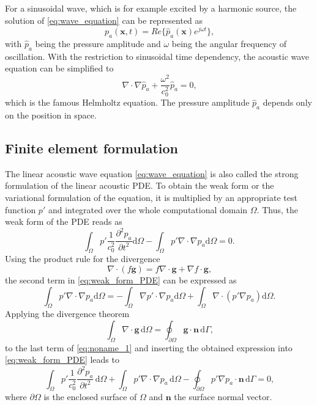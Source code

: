 For a sinusoidal wave, which is for example excited by a harmonic source, the solution of \cref{eq:wave_equation} can be represented as
\begin{equation}
	p_a(\boldsymbol{x},t) = Re\lbrace\hat{p}_a(\boldsymbol{x})e^{j\omega t}\rbrace \text{,} \label{eq:sinusoidal_wave}
\end{equation}
with $\hat{p}_a$ being the pressure amplitude and $\omega$ being the angular frequency of oscillation. With the restriction to sinusoidal time dependency, the acoustic wave equation can be simplified to
\begin{equation}
	\nabla\cdot\nabla\hat{p}_a + \frac{\omega^2}{c_0^2}\hat{p}_a = 0 \text{,} \label{eq:helmholtz_equation}
\end{equation}
which is the famous Helmholtz equation. The pressure amplitude $\hat{p}_a$ depends only on the position in space.

\subsection*{Finite element formulation}

The linear acoustic wave equation \cref{eq:wave_equation} is also called the strong formulation of the linear acoustic PDE. To obtain the weak form or the variational formulation of the equation, it is multiplied by an appropriate test function $p'$ and integrated over the whole computational domain $\Omega$. Thus, the weak form of the PDE reads as
\begin{equation}
	\int_{\Omega}p'\frac{1}{c_0^2}\frac{\partial^2 p_a}{\partial t^2}\text{d}\Omega - \int_{\Omega}p'\nabla\cdot\nabla p_a\text{d}\Omega = 0\text{.} \label{eq:weak_form_PDE}
\end{equation}
Using the product rule for the divergence
\begin{equation}
	\nabla\cdot(f\boldsymbol{g}) = f\nabla\cdot\boldsymbol{g} + \nabla f \cdot \boldsymbol{g}\text{,}
\end{equation}
the second term in \cref{eq:weak_form_PDE} can be expressed as
\begin{equation}
	\int_{\Omega}p'\nabla\cdot\nabla p_a\text{d}\Omega = - \int_{\Omega}\nabla p'\cdot\nabla p_a\text{d}\Omega + \int_{\Omega}\nabla\cdot(p'\nabla p_a)\text{d}\Omega \text{.} \label{eq:noname_1}
\end{equation}
Applying the divergence theorem \cite{kreyszig_advanced, wiley_mathematics_1995}
\begin{equation}
	\int_{\Omega} \nabla\cdot \boldsymbol{g}\,\text{d}\Omega = \oint_{\partial \Omega} \boldsymbol{g}\cdot\boldsymbol{n}\,\text{d}\Gamma \text{,}
\end{equation}
to the last term of \cref{eq:noname_1} and inserting the obtained expression into \cref{eq:weak_form_PDE} leads to
\begin{equation}
	\int_{\Omega}p'\frac{1}{c_0^2}\frac{\partial^2 p_a}{\partial t^2}\,\text{d}\Omega + \int_{\Omega}p'\nabla\cdot\nabla p_a\,\text{d}\Omega - \oint_{\partial\Omega} p'\nabla p_a \cdot \boldsymbol{n}\,\text{d}\Gamma = 0\text{,} \label{eq:noname_2}
\end{equation}
where $\partial \Omega$ is the enclosed surface of $\Omega$ and $\boldsymbol{n}$ the surface normal vector.

